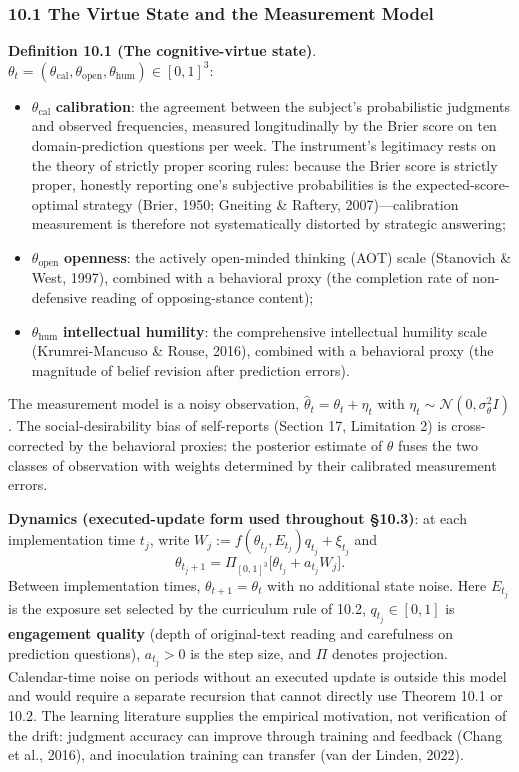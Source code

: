 \documentclass[
  11pt]{article}
\providecommand{\tightlist}{%
  \setlength{\itemsep}{0pt}\setlength{\parskip}{0pt}}
\begin{document}
\subsubsection{10.1 The Virtue State and the Measurement
Model}\label{the-virtue-state-and-the-measurement-model}

\textbf{Definition 10.1 (The cognitive-virtue state)}.
\(\theta_t = (\theta_{\mathrm{cal}}, \theta_{\mathrm{open}}, \theta_{\mathrm{hum}}) \in [0,1]^3\):

\begin{itemize}
\tightlist
\item
  \(\theta_{\mathrm{cal}}\) \textbf{calibration}: the agreement between
  the subject's probabilistic judgments and observed frequencies,
  measured longitudinally by the Brier score on ten domain-prediction
  questions per week. The instrument's legitimacy rests on the theory of
  strictly proper scoring rules: because the Brier score is strictly
  proper, honestly reporting one's subjective probabilities is the
  expected-score-optimal strategy (Brier, 1950; Gneiting \& Raftery,
  2007)---calibration measurement is therefore not systematically
  distorted by strategic answering;
\item
  \(\theta_{\mathrm{open}}\) \textbf{openness}: the actively open-minded
  thinking (AOT) scale (Stanovich \& West, 1997), combined with a
  behavioral proxy (the completion rate of non-defensive reading of
  opposing-stance content);
\item
  \(\theta_{\mathrm{hum}}\) \textbf{intellectual humility}: the
  comprehensive intellectual humility scale (Krumrei-Mancuso \& Rouse,
  2016), combined with a behavioral proxy (the magnitude of belief
  revision after prediction errors).
\end{itemize}

The measurement model is a noisy observation,
\(\hat\theta_t = \theta_t + \eta_t\) with
\(\eta_t \sim \mathcal{N}(0, \sigma_\theta^2 I)\). The
social-desirability bias of self-reports (Section 17, Limitation 2) is
cross-corrected by the behavioral proxies: the posterior estimate of
\(\theta\) fuses the two classes of observation with weights determined
by their calibrated measurement errors.

\textbf{Dynamics (executed-update form used throughout §10.3)}: at each
implementation time \(t_j\), write
\(W_j:=f(\theta_{t_j},E_{t_j})q_{t_j}+\xi_{t_j}\) and
\[\theta_{t_j+1}=\Pi_{[0,1]^3}\big[\theta_{t_j}+a_{t_j}W_j\big].\]
Between implementation times, \(\theta_{t+1}=\theta_t\) with no
additional state noise. Here \(E_{t_j}\) is the exposure set selected by
the curriculum rule of 10.2, \(q_{t_j}\in[0,1]\) is \textbf{engagement
quality} (depth of original-text reading and carefulness on prediction
questions), \(a_{t_j}>0\) is the step size, and \(\Pi\) denotes
projection. Calendar-time noise on periods without an executed update is
outside this model and would require a separate recursion that cannot
directly use Theorem 10.1 or 10.2. The learning literature supplies the
empirical motivation, not verification of the drift: judgment accuracy
can improve through training and feedback (Chang et al., 2016), and
inoculation training can transfer (van der Linden, 2022).
\end{document}

